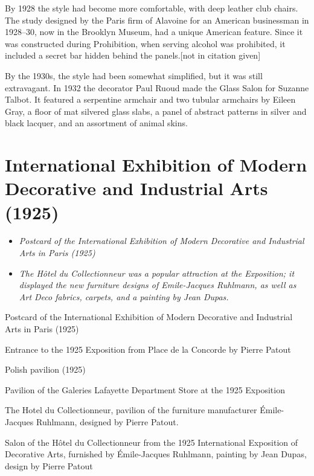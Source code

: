 By 1928 the style had become more comfortable, with deep leather club
chairs. The study designed by the Paris firm of Alavoine for an American
businessman in 1928--30, now in the Brooklyn Museum, had a unique
American feature. Since it was constructed during Prohibition, when
serving alcohol was prohibited, it included a secret bar hidden behind
the panels.{[}not in citation given{]}

By the 1930s, the style had been somewhat simplified, but it was still
extravagant. In 1932 the decorator Paul Ruoud made the Glass Salon for
Suzanne Talbot. It featured a serpentine armchair and two tubular
armchairs by Eileen Gray, a floor of mat silvered glass slabs, a panel
of abstract patterns in silver and black lacquer, and an assortment of
animal skins.

\section{International Exhibition of Modern Decorative and Industrial
Arts
(1925)}\label{international-exhibition-of-modern-decorative-and-industrial-arts-1925}

\begin{itemize}
\item
  \emph{Postcard of the International Exhibition of Modern Decorative
  and Industrial Arts in Paris (1925)}
\item
  \emph{The Hôtel du Collectionneur was a popular attraction at the
  Exposition; it displayed the new furniture designs of Emile-Jacques
  Ruhlmann, as well as Art Deco fabrics, carpets, and a painting by Jean
  Dupas.}
\end{itemize}

Postcard of the International Exhibition of Modern Decorative and
Industrial Arts in Paris (1925)

Entrance to the 1925 Exposition from Place de la Concorde by Pierre
Patout

Polish pavilion (1925)

Pavilion of the Galeries Lafayette Department Store at the 1925
Exposition

The Hotel du Collectionneur, pavilion of the furniture manufacturer
Émile-Jacques Ruhlmann, designed by Pierre Patout.

Salon of the Hôtel du Collectionneur from the 1925 International
Exposition of Decorative Arts, furnished by Émile-Jacques Ruhlmann,
painting by Jean Dupas, design by Pierre Patout

